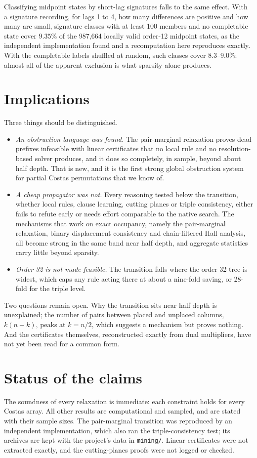 \documentclass[11pt,a4paper,oneside]{report}
\theoremstyle{definition}
\begin{document}
Classifying midpoint states by short-lag signatures falls to the same effect. With a signature recording,
for lags 1 to 4, how many differences are positive and how many are small, signature classes with at least
100 members and no completable state cover $9.35\%$ of the 987{,}664 locally valid order-12 midpoint states,
as the independent implementation found and a recomputation here reproduces exactly. With the completable
labels shuffled at random, such classes cover $8.3$--$9.0\%$: almost all of the apparent exclusion is what
sparsity alone produces.

\section{Implications}
\label{p10-sec:implications}
Three things should be distinguished.
\begin{itemize}
\item \emph{An obstruction language was found.} The pair-marginal relaxation proves dead prefixes infeasible
with linear certificates that no local rule and no resolution-based solver produces, and it does so
completely, in sample, beyond about half depth. That is new, and it is the first strong global obstruction
system for partial Costas permutations that we know of.
\item \emph{A cheap propagator was not.} Every reasoning tested below the transition, whether local
rules, clause learning, cutting planes or triple consistency, either fails to refute early or needs effort
comparable to the native search. The mechanisms that work on exact occupancy, namely the pair-marginal
relaxation, binary displacement consistency and chain-filtered Hall analysis, all become strong in the
same band near half depth, and aggregate statistics carry little beyond sparsity.
\item \emph{Order 32 is not made feasible.} The transition falls where the order-32 tree is widest, which caps
any rule acting there at about a nine-fold saving, or 28-fold for the triple level.
\end{itemize}
Two questions remain open. Why the transition sits near half depth is unexplained; the number of pairs
between placed and unplaced columns, $k(n-k)$, peaks at $k=n/2$, which suggests a mechanism but proves
nothing. And the certificates themselves, reconstructed exactly from dual multipliers, have not yet been
read for a common form.


\section{Status of the claims}\label{p10-sec:status}
The soundness of every relaxation is immediate: each constraint holds for every Costas array. All
other results are computational and sampled, and are stated with their sample sizes. The pair-marginal
transition was reproduced by an independent implementation, which also ran the triple-consistency test;
its archives are kept with the project's data in \texttt{mining/}. Linear certificates were not extracted
exactly, and the cutting-planes proofs were not logged or checked.
\end{document}
